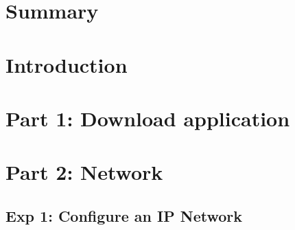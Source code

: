 \documentclass[compilation.tex]{subfiles}
\begin{document}
\section{Summary}
\label{sec:summary}

\section{Introduction}
\label{sec:introduction}

\section{Part 1: Download application}
\label{sec:downloadapp}

\section{Part 2: Network}
\label{sec:network}

\subsection{Exp 1: Configure an IP Network}
\label{exp:1}
\end{document}
